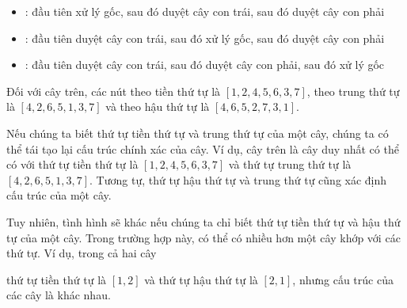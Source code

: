 \begin{itemize}
\item {}: đầu tiên xử lý gốc,
sau đó duyệt cây con trái, sau đó duyệt cây con phải
\item {}: đầu tiên duyệt cây con trái,
sau đó xử lý gốc, sau đó duyệt cây con phải
\item {}: đầu tiên duyệt cây con trái,
sau đó duyệt cây con phải, sau đó xử lý gốc
\end{itemize}

Đối với cây trên, các nút theo
tiền thứ tự là
$[1,2,4,5,6,3,7]$,
theo trung thứ tự là $[4,2,6,5,1,3,7]$
và theo hậu thứ tự là $[4,6,5,2,7,3,1]$.

Nếu chúng ta biết thứ tự tiền thứ tự và trung thứ tự
của một cây, chúng ta có thể tái tạo lại cấu trúc chính xác của cây.
Ví dụ, cây trên là cây duy nhất có thể có
với thứ tự tiền thứ tự là $[1,2,4,5,6,3,7]$ và
thứ tự trung thứ tự là $[4,2,6,5,1,3,7]$.
Tương tự, thứ tự hậu thứ tự và trung thứ tự
cũng xác định cấu trúc của một cây.

Tuy nhiên, tình hình sẽ khác nếu chúng ta chỉ biết
thứ tự tiền thứ tự và hậu thứ tự của một cây.
Trong trường hợp này, có thể có nhiều hơn một cây
khớp với các thứ tự.
Ví dụ, trong cả hai cây
\begin{center}
\end{center}
thứ tự tiền thứ tự là $[1,2]$ và thứ tự hậu thứ tự là $[2,1]$,
nhưng cấu trúc của các cây là khác nhau.


